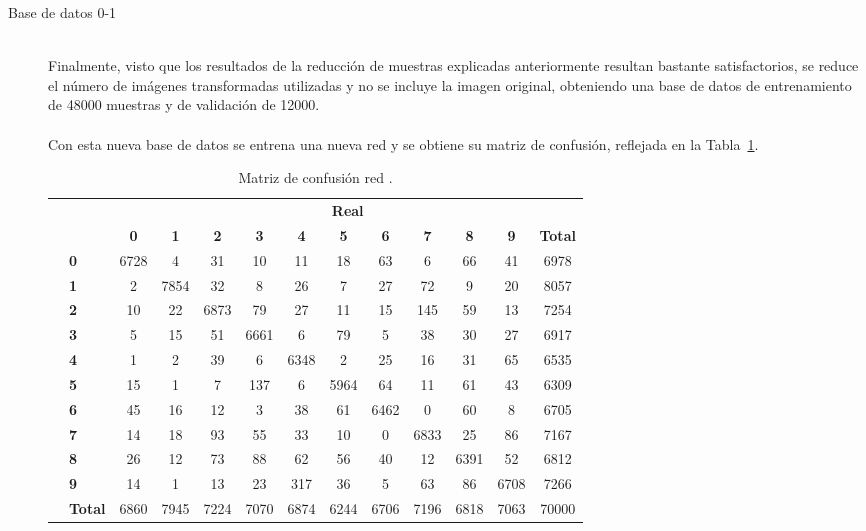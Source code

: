 \begin{description}
\begin{table}[H]
		\label{tab.matriz}
	\end{table}
	\item[Base de datos 0-1] \hfill 
	\vspace{10pt}
	\\
	Finalmente, visto que los resultados de la reducción de muestras explicadas anteriormente resultan bastante satisfactorios, se reduce el número de imágenes transformadas utilizadas y no se incluye la imagen original, obteniendo una base de datos de entrenamiento de 48000 muestras y de validación de 12000.\\
	\vspace{-10pt}
	\\
	Con esta nueva base de datos se entrena una nueva red y se obtiene su matriz de confusión, reflejada en la Tabla~\ref{tab.matriz0-1}.
	\begin{table}[H]
		\centering
		\begin{tabular}{|c|l|c|c|c|c|c|c|c|c|c|c|c|}
			\cline{3-13} 
			\multicolumn{2}{c|}{} & \multicolumn{11}{c|}{\textbf{Real}} \\ \cline{3-13} 
			\multicolumn{2}{c|}{} & \textbf{0} & \textbf{1} & \textbf{2} &  \textbf{3} & \textbf{4} & \textbf{5} & \textbf{6} & \textbf{7} & \textbf{8} & \textbf{9} & \textbf{Total}\\ \hline
			\multirow{10}{0.5cm}{\rotatebox{90}{\textbf{Predicción}}}& \textbf{0} & \cellcolor{lightgray}6728 & 4 & 31 & 10 & 11 & 18 & 63 & 6 & 66 & 41 & 6978\\ \cline{2-13}
			& \textbf{1} & 2 & \cellcolor{lightgray}7854 & 32 & 8 & 26 & 7 & 27 & 72 & 9 & 20 & 8057\\ \cline{2-13}
			& \textbf{2} & 10 & 22 & \cellcolor{lightgray}6873 & 79 & 27 & 11 & 15 & 145 & 59 & 13 & 7254\\ \cline{2-13}
			& \textbf{3} & 5 & 15 & 51 & \cellcolor{lightgray}6661 & 6 & 79 & 5 & 38 & 30 & 27 & 6917\\ \cline{2-13}
			& \textbf{4} & 1 & 2 & 39 & 6 & \cellcolor{lightgray}6348 & 2 & 25 & 16 & 31 & 65 & 6535\\ \cline{2-13}
			& \textbf{5} & 15 & 1 & 7 & 137 & 6 & \cellcolor{lightgray}5964 & 64 & 11 & 61 & 43 & 6309\\ \cline{2-13}
			& \textbf{6} & 45 & 16 & 12 & 3 & 38 & 61 & \cellcolor{lightgray}6462 & 0 & 60 & 8 & 6705\\ \cline{2-13}
			& \textbf{7} & 14 & 18 & 93 & 55 & 33 & 10 & 0 & \cellcolor{lightgray}6833 & 25 & 86 & 7167\\ \cline{2-13}
			& \textbf{8} & 26 & 12 & 73 & 88 & 62 & 56 & 40 & 12 & \cellcolor{lightgray}6391 & 52 & 6812\\ \cline{2-13}
			& \textbf{9} & 14 & 1 & 13 & 23 & 317 & 36 & 5 & 63 & 86 & \cellcolor{lightgray}6708 & 7266\\ \cline{2-13}
			& \textbf{Total} & 6860 & 7945 & 7224 & 7070 & 6874 & 6244 & 6706 & 7196 & 6818 & 7063 & 70000\\ \hline
		\end{tabular}
		\caption{Matriz de confusión red .}
		\label{tab.matriz0-1}
	\end{table}
\end{description}

